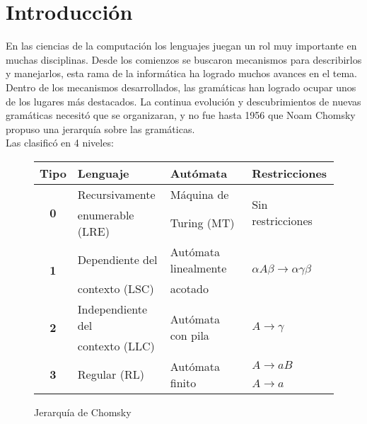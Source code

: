 \chapter{Introducci\'on}
\label{chap:intro}
\minitoc

En las ciencias de la computación los lenguajes juegan un rol muy importante en muchas disciplinas. Desde los comienzos
se buscaron mecanismos para describirlos y manejarlos, esta rama de la informática ha logrado muchos avances en el tema.
Dentro de los mecanismos desarrollados, las gramáticas han logrado ocupar unos de los lugares más destacados. La continua 
evolución y descubrimientos de nuevas gramáticas necesitó que se organizaran, y no fue hasta 1956 que Noam Chomsky propuso
una jerarquía sobre las gramáticas.\\
Las clasificó en 4 niveles:\\

\begin{figure}[h!]\centering 
\begin{tabular}{| c | p{3.5cm} | p{4cm} | p{3cm} |}
\hline

\rowcolor{gris} \textbf{Tipo} & \textbf{Lenguaje} & \textbf{Autómata} & \textbf{Restricciones} \\ \hline

\multirow{2}{*}{\textbf{0}} & Recursivamente   & Máquina de  & \multirow{2}{*}{Sin restricciones} \\ 
                            & enumerable (LRE) & Turing (MT) & \\ \hline

\multirow{2}{*}{\textbf{1}} & Dependiente del & Autómata linealmente & \multirow{2}{*}{$\alpha A \beta \rightarrow \alpha\gamma\beta$} \\ 
                            & contexto (LSC)  & acotado              & \\ \hline

\multirow{2}{*}{\textbf{2}} & Independiente del & \multirow{2}{*}{Autómata con pila} & \multirow{2}{*}{$A \rightarrow \gamma$} \\ 
                            & contexto (LLC)    &                   & \\ \hline

\multirow{2}{*}{\textbf{3}} & \multirow{2}{*}{Regular (RL)} & \multirow{2}{*}{Autómata finito} & $A \rightarrow aB$ \\ 
                            &              &                 & $A \rightarrow a$ \\ \hline
\end{tabular}\caption{\label{chomsky} Jerarquía de Chomsky}
\end{figure}

